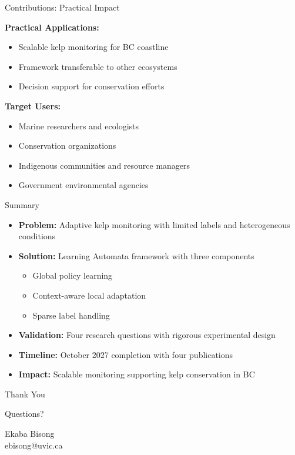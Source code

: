 \documentclass[10pt,xcolor={table,dvipsnames},t]{beamer}
\begin{document}
\begin{frame}{Contributions: Practical Impact}

\textbf{Practical Applications:}
\begin{itemize}
  \item Scalable kelp monitoring for BC coastline
  \item Framework transferable to other ecosystems
  \item Decision support for conservation efforts
\end{itemize}

\vspace{0.5em}
\textbf{Target Users:}
\begin{itemize}
  \item Marine researchers and ecologists
  \item Conservation organizations
  \item Indigenous communities and resource managers
  \item Government environmental agencies
\end{itemize}

\end{frame}

\begin{frame}{Summary}

\begin{itemize}
  \item \textbf{Problem:} Adaptive kelp monitoring with limited labels and heterogeneous conditions

  \vspace{0.3em}
  \item \textbf{Solution:} Learning Automata framework with three components
  \begin{itemize}
    \item Global policy learning
    \item Context-aware local adaptation
    \item Sparse label handling
  \end{itemize}

  \vspace{0.3em}
  \item \textbf{Validation:} Four research questions with rigorous experimental design

  \vspace{0.3em}
  \item \textbf{Timeline:} October 2027 completion with four publications

  \vspace{0.3em}
  \item \textbf{Impact:} Scalable monitoring supporting kelp conservation in BC
\end{itemize}

\end{frame}

\begin{frame}{}

\vspace{2em}
\centering
{\Huge Thank You}

\vspace{1.5em}
{\Large Questions?}

\vspace{2em}
\normalsize
Ekaba Bisong\\
ebisong@uvic.ca

\end{frame}
\end{document}
